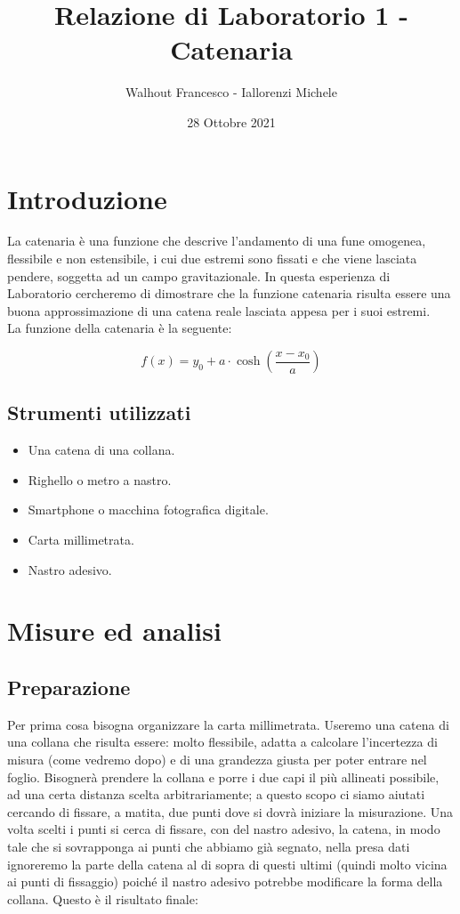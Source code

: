 \documentclass{article}
\title{Relazione di Laboratorio 1 - Catenaria}
\author{Walhout Francesco - Iallorenzi Michele}
\date{28 Ottobre 2021}
\begin{document}
\maketitle

\section{Introduzione}
La catenaria è una funzione che descrive l'andamento di una fune omogenea, 
flessibile e non estensibile, i cui due estremi sono fissati e che viene lasciata pendere,
soggetta ad un campo gravitazionale.
In questa esperienza di Laboratorio cercheremo di dimostrare che la funzione
catenaria risulta essere una buona approssimazione di una catena reale lasciata appesa
per i suoi estremi.\\
La funzione della catenaria è la seguente:

\begin{equation}
    \label{eq:catenaria}
    f(x) = y_0 + a \cdot \cosh(\frac{x-x_0}{a})
\end{equation}

\subsection{Strumenti utilizzati}
\begin{itemize}
    \item Una catena di una collana.
    \item Righello o metro a nastro.
    \item Smartphone o macchina fotografica digitale.
    \item Carta millimetrata.
    \item Nastro adesivo.
\end{itemize}

\section{Misure ed analisi}

\subsection{Preparazione}
Per prima cosa bisogna organizzare la carta millimetrata.
Useremo una catena di una collana che risulta essere:
molto flessibile,
adatta a calcolare l'incertezza di misura (come vedremo dopo)
e di una grandezza giusta per poter entrare nel foglio.
Bisognerà prendere la collana e porre i due capi il più allineati possibile,
ad una certa distanza scelta arbitrariamente;
a questo scopo ci siamo aiutati cercando di fissare, a matita,
due punti dove si dovrà iniziare la misurazione.
Una volta scelti i punti si cerca di fissare, con del nastro adesivo, la catena,
in modo tale che si sovrapponga ai punti che abbiamo già segnato,
nella presa dati ignoreremo la parte della catena al di sopra di questi ultimi
(quindi molto vicina ai punti di fissaggio) poiché 
il nastro adesivo potrebbe modificare la forma della collana.
Questo è il risultato finale:
\end{document}
